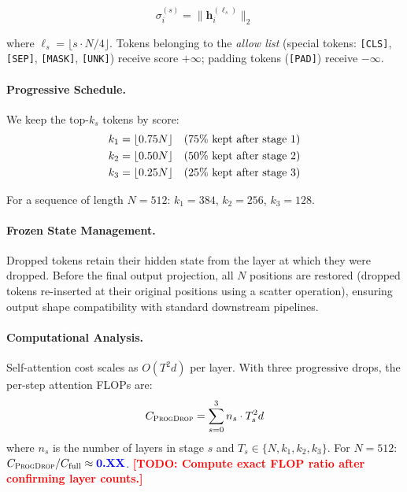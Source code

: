 \documentclass[11pt]{article}
\newcommand{\model}{\textsc{ProgDrop}}          %
\newcommand{\norm}[1]{\lVert #1 \rVert_2}       %
\newcommand{\TODO}[1]{\textcolor{red}{\textbf{[TODO: #1]}}}
\newcommand{\RESULT}[1]{\textcolor{blue}{\textbf{#1}}}  %
\begin{document}
\begin{equation}
  \label{eq:score}
  \sigma_i^{(s)} = \norm{\mathbf{h}_i^{(\ell_s)}}
\end{equation}

where $\ell_s = \lfloor s \cdot N/4 \rfloor$.
Tokens belonging to the \emph{allow list} (special tokens: \texttt{[CLS]},
\texttt{[SEP]}, \texttt{[MASK]}, \texttt{[UNK]}) receive score $+\infty$;
padding tokens (\texttt{[PAD]}) receive $-\infty$.

\paragraph{Progressive Schedule.}
We keep the top-$k_s$ tokens by score:
\begin{align}
  k_1 &= \lfloor 0.75 N \rfloor & & \text{(75\% kept after stage 1)} \notag \\
  k_2 &= \lfloor 0.50 N \rfloor & & \text{(50\% kept after stage 2)} \notag \\
  k_3 &= \lfloor 0.25 N \rfloor & & \text{(25\% kept after stage 3)} \notag
\end{align}

For a sequence of length $N=512$: $k_1=384$, $k_2=256$, $k_3=128$.

\paragraph{Frozen State Management.}
Dropped tokens retain their hidden state from the layer at which they were
dropped.
Before the final output projection, all $N$ positions are restored
(dropped tokens re-inserted at their original positions using a scatter
operation), ensuring output shape compatibility with standard downstream
pipelines.

\paragraph{Computational Analysis.}
Self-attention cost scales as $O(T^2 d)$ per layer.
With three progressive drops, the per-step attention FLOPs are:
\begin{equation}
  \label{eq:flops}
  C_{\model} = \sum_{s=0}^{3} n_s \cdot T_s^2 d
\end{equation}
where $n_s$ is the number of layers in stage $s$ and $T_s \in \{N, k_1, k_2, k_3\}$.
For $N=512$: $C_{\model} / C_{\text{full}} \approx \RESULT{0.XX}$.
\TODO{Compute exact FLOP ratio after confirming layer counts.}
\end{document}
